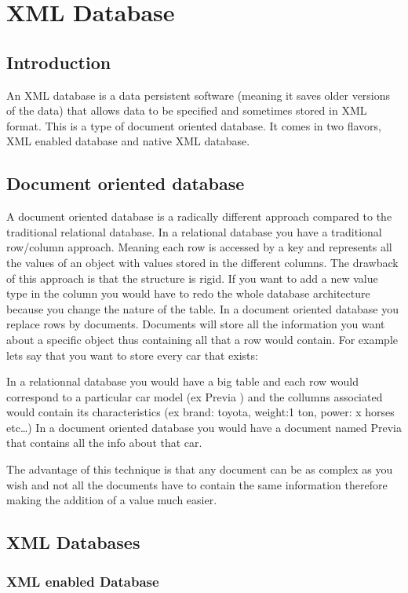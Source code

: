 

\chapter{XML Database}
\section{Introduction}
An XML database is a data persistent software (meaning it saves older versions of the data) that allows data to be specified and sometimes stored in XML format. This is a type of document oriented database. It comes in two flavors, XML enabled database and native XML database.
\section{Document oriented database}

A document oriented database is a radically different approach compared to the traditional relational database. In a relational database you have a traditional row/column approach. Meaning each row is accessed by a key and represents all the values of an object with values stored in the different columns. The drawback of this approach is that the structure is rigid. If you want to add a new value type in the column you would have to redo the whole database architecture because you change the nature of the table. In a document oriented database you replace rows by documents. Documents will store all the information you want about a specific object thus containing all that a row would contain. For example lets say that you want to store every car that exists:

    In a relationnal database you would have a big table and each row would correspond to a particular car model (ex Previa ) and the collumns associated would contain its characteristics (ex brand: toyota, weight:1 ton, power: x horses etc…)
    In a document oriented database you would have a document named Previa that contains all the info about that car.

The advantage of this technique is that any document can be as complex as you wish and not all the documents have to contain the same information therefore making the addition of a value much easier.
\section{XML Databases}
\subsection{XML enabled Database}

